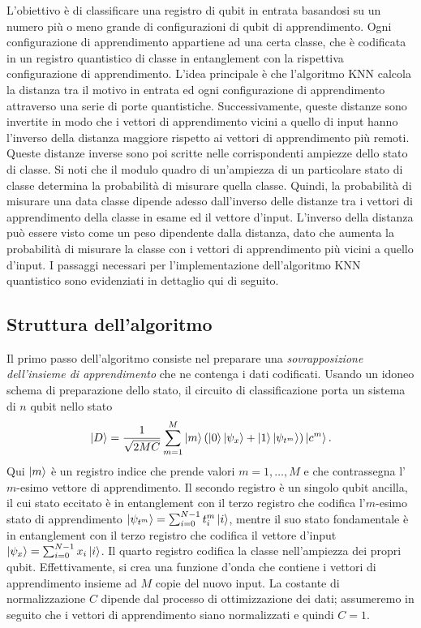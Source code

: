 L'obiettivo è di classificare una registro di qubit in entrata basandosi 
su un numero più o meno grande di configurazioni di qubit di apprendimento. 
Ogni configurazione di apprendimento appartiene ad una certa classe, che è 
codificata in un registro quantistico di classe in entanglement con la rispettiva 
configurazione di apprendimento. L'idea principale è che l'algoritmo \ac{KNN} 
calcola la distanza tra il motivo in entrata ed ogni configurazione di 
apprendimento attraverso una serie di porte quantistiche. 
Successivamente, queste distanze sono invertite in modo che i vettori di 
apprendimento vicini a quello di input hanno l'inverso della distanza 
maggiore rispetto ai vettori di apprendimento più remoti. Queste distanze inverse 
sono poi scritte nelle corrispondenti ampiezze dello stato di classe. 
Si noti che il modulo quadro di un'ampiezza di un particolare stato di classe 
determina la probabilità di misurare quella classe. 
Quindi, la probabilità di misurare una data classe dipende adesso dall'inverso 
delle distanze tra i vettori di apprendimento della classe in esame ed il 
vettore d'input. L'inverso della distanza può essere visto come un peso 
dipendente dalla distanza, dato che aumenta la probabilità di misurare la 
classe con i vettori di apprendimento più vicini a quello d'input. 
I passaggi necessari per l'implementazione dell'algoritmo \ac{KNN} quantistico 
sono evidenziati in dettaglio qui di seguito. 

\subsection{Struttura dell'algoritmo}

Il primo passo dell'algoritmo consiste nel preparare una 
\emph{sovrapposizione dell'insieme di apprendimento} che 
ne contenga i dati codificati. 
Usando un idoneo schema di preparazione dello stato, 
il circuito di classificazione porta un sistema di $n$ 
qubit nello stato 
\begin{equation}
    \ket{D} = \frac{1}{\sqrt{2MC}} \sum_{m=1}^M \ket{m} 
    \left( \ket{0}\ket{\psi_x} + \ket{1}\ket{\psi_{t^m}} \right)
    \ket{c^m}.
\end{equation}
Qui $\ket{m}$ è un registro indice che prende valori 
$m=1,\ldots,M$ e che contrassegna l'$m$-esimo vettore 
di apprendimento. 
Il secondo registro è un singolo qubit ancilla, il cui 
stato eccitato è in entanglement con il terzo registro 
che codifica l'$m$-esimo stato di apprendimento 
$\ket{\psi_{t^m}} = \sum_{i=0}^{N-1} t_i^m \ket{i}$, 
mentre il suo stato fondamentale è in entanglement con 
il terzo registro che codifica il vettore d'input 
$\ket{\psi_x} = \sum_{i=0}^{N-1} x_i \ket{i}$. 
Il quarto registro codifica la classe nell'ampiezza dei propri qubit. 
Effettivamente, si crea una funzione d'onda che contiene 
i vettori di apprendimento insieme ad $M$ copie del nuovo 
input. La costante di normalizzazione $C$ dipende dal 
processo di ottimizzazione dei dati; 
assumeremo in seguito che i vettori di apprendimento siano 
normalizzati e quindi $C=1$. 

